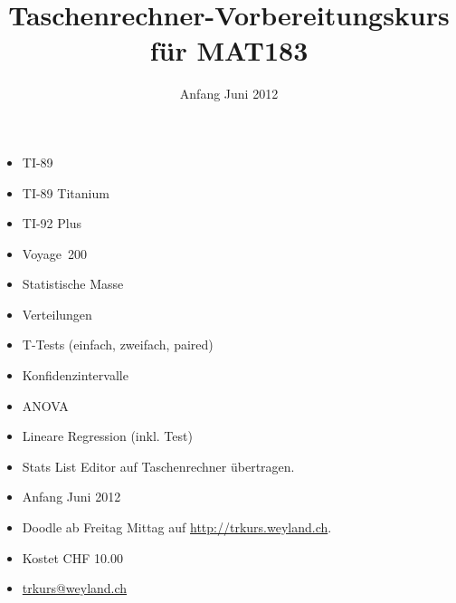 \documentclass[a4paper,12pt,notitlepage,halfparskip,headsepline,normalheadings,twoside]{scrartcl}
\title{Taschenrechner-Vorbereitungskurs \\für MAT183}
\date{Anfang Juni 2012}
\begin{document}
\maketitle

\begin{multicols}{2}
\begin{itemize}
\item TI-89
\item TI-89 Titanium
\item TI-92 Plus
\item Voyage\texttrademark~200
\end{itemize}
\end{multicols}

\begin{multicols}{2}
\begin{itemize}
\item Statistische Masse
\item Verteilungen
\item T-Tests (einfach, zweifach, paired)
\item Konfidenzintervalle
\item ANOVA
\item Lineare Regression (inkl. Test)
\end{itemize}
\end{multicols}

\begin{itemize}
\item Stats List Editor auf Taschenrechner übertragen.
\end{itemize}

\begin{itemize}
\item Anfang Juni 2012
\item Doodle ab Freitag Mittag auf \url{http://trkurs.weyland.ch}.
\end{itemize}

\begin{itemize}
\item Kostet CHF 10.00
\item \url{trkurs@weyland.ch}
\end{itemize}
\end{document}
